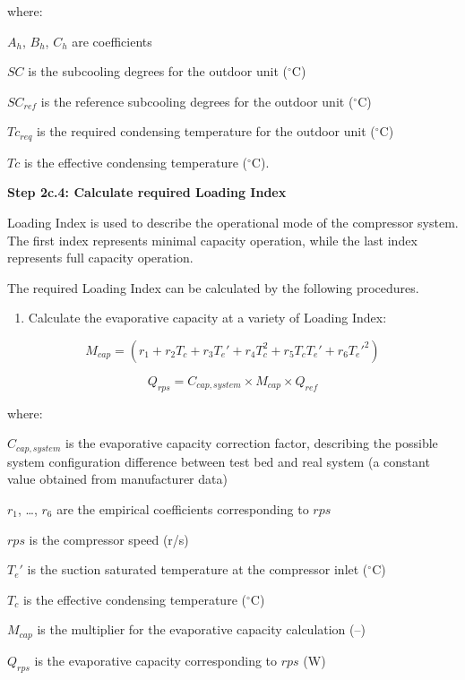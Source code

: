 where:

$A_h$, $B_h$, $C_h$ are coefficients

$SC$ is the subcooling degrees for the outdoor unit (\(^{\circ}\)C)

$SC_{ref}$ is the reference subcooling degrees for the outdoor unit (\(^{\circ}\)C)

$Tc_{req}$ is the required condensing temperature for the outdoor unit (\(^{\circ}\)C)

$Tc$ is the effective condensing temperature (\(^{\circ}\)C).

\textbf{Step 2c.4: Calculate required Loading Index}

Loading Index is used to describe the operational mode of the compressor system. The first index represents minimal capacity operation, while the last index represents full capacity operation.

The required Loading Index can be calculated by the following procedures.

\begin{enumerate}
\def\labelenumi{\alph{enumi}.}
\tightlist
\item Calculate the evaporative capacity at a variety of Loading Index:
\end{enumerate}

\begin{equation}
M_{cap}=(r_1+r_2T_c+r_3{T_e}'+r_4T_c^2+r_5T_c{T_e}'+r_6{T_e}'^2)
\end{equation}

\begin{equation}
Q_{rps}=C_{cap,system} \times M_{cap} \times Q_{ref}
\end{equation}

where:

$C_{cap,system}$ is the evaporative capacity correction factor, describing the possible system configuration difference between test bed and real system (a constant value obtained from manufacturer data)

$r_1$, \ldots, $r_6$ are the empirical coefficients corresponding to $rps$

$rps$ is the compressor speed (r/s)

${T_e}'$ is the suction saturated temperature at the compressor inlet (\(^{\circ}\)C)

$T_c$ is the effective condensing temperature (\(^{\circ}\)C)

$M_{cap}$ is the multiplier for the evaporative capacity calculation (--)

$Q_{rps}$ is the evaporative capacity corresponding to $rps$ (W)

